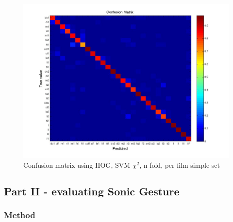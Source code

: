 \begin{figure}[htbp]
	\centering{}
	\includegraphics[width=\linewidth]{confmat/confusion.jpg}
	\caption{Confusion matrix using HOG, SVM $\chi^2$, n-fold, per film simple set}
	\label{fig:confusion}
\end{figure}




\subsection{Part II - evaluating Sonic Gesture}

\subsubsection{Method}

